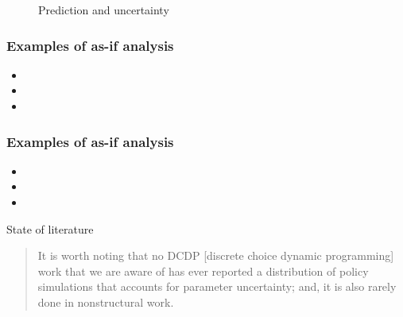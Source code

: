 \begin{frame}\label{fig:final-school}
    \begin{figure}[h!]\centering
    \caption{Prediction and uncertainty}
    \end{figure}
\end{frame}
\begin{frame}\frametitle{Examples of as-if analysis}\label{Examples of as-if analysis}
\vspace{0.3cm}\vspace{0.3cm}
\begin{itemize}\setlength\itemsep{1em}
  \item {}
  \item {}
  \item {}
\end{itemize}
\end{frame}
\begin{frame}\frametitle{Examples of as-if analysis}
\vspace{0.3cm}\vspace{0.3cm}
\begin{itemize}\setlength\itemsep{1em}
  \item {}
  \item {}
  \item {}
\end{itemize}
\end{frame}
\begin{frame}{State of literature}
  \vspace{1cm}
  \begin{quote}\centering
    It is worth noting that no DCDP [discrete choice dynamic programming] work that we are aware of has ever reported a distribution of policy simulations that accounts for parameter uncertainty; and, it is also rarely done in nonstructural work.
  \end{quote}
  \centering
  \textendash \space \citet*{Keane.2011d}
\end{frame}
